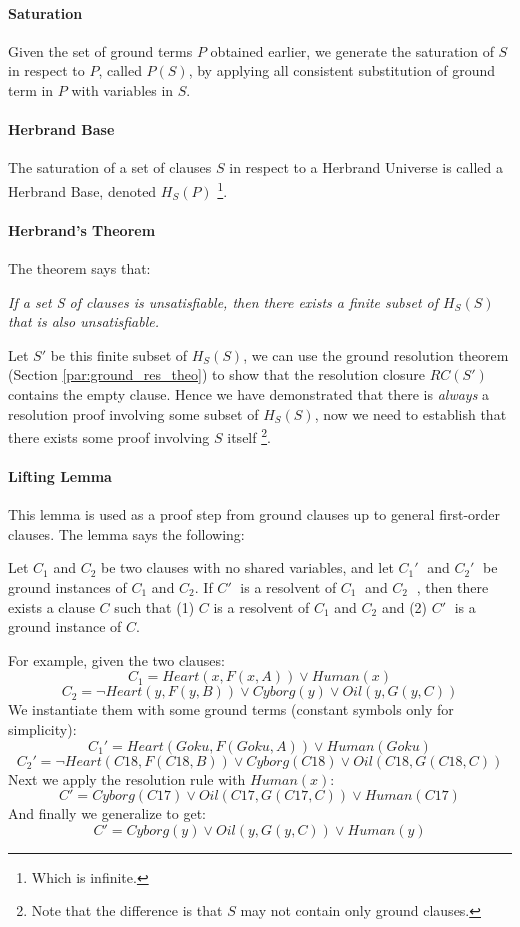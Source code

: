 \documentclass[10pt,a4paper]{article}
\begin{document}
\paragraph{Saturation} Given the set of ground terms $P$ obtained earlier, we generate the saturation of $S$ in respect to $P$, called $P(S)$, by applying all consistent substitution of ground term in $P$ with variables in $S$.

\paragraph{Herbrand Base}
\label{sec:herbrand_base}
The saturation of a set of clauses $S$ in respect to a Herbrand Universe is called a Herbrand Base, denoted $H_S(P)$ \footnote{Which is infinite.}.

\paragraph{Herbrand's Theorem}
The theorem says that:
\begin{center}
\textit{If a set S of clauses is unsatisfiable, then there exists a finite subset of $H_S(S)$ that
is also unsatisfiable.}
\end{center}
Let $S'$ be this finite subset of $H_S(S)$, we can use the ground resolution theorem (Section \ref{par:ground_res_theo}) to show that the resolution closure $RC(S')$ contains the empty clause. Hence we have demonstrated that there is \textit{always} a resolution proof involving some subset of $H_S(S)$, now we need to establish that there exists some proof involving $S$ itself \footnote{Note that the difference is that $S$ may not contain only ground clauses.}.

\paragraph{Lifting Lemma}
This lemma is used as a proof step from ground clauses up to general first-order clauses. The lemma says the following:
\begin{center}
Let $C_1$ and $C_2$ be two clauses with no shared variables, and let $C_1'$ and $C_2'$ be ground instances of $C_1$ and $C_2$. If $C'$ is a resolvent of $C_1$ and $C_2$ , then there exists a clause $C$ such that (1) $C$ is a resolvent of $C_1$ and $C_2$ and (2) $C'$ is a ground instance of $C$.
\end{center} 
For example, given the two clauses:
\[C_1=Heart(x,F(x,A))\vee Human(x)\]
\[C_2=\neg Heart(y,F(y,B))\vee Cyborg(y)\vee Oil(y,G(y,C))\]
We instantiate them with some ground terms (constant symbols only for simplicity):
\[C_1'=Heart(Goku,F(Goku,A))\vee Human(Goku)\]
\[C_2'=\neg Heart(C18,F(C18,B))\vee Cyborg(C18)\vee Oil(C18,G(C18,C))\]
Next we apply the resolution rule with $Human(x)$:
\[C'=Cyborg(C17)\vee Oil(C17,G(C17,C))\vee Human(C17)\]
And finally we generalize to get:
\[C'=Cyborg(y)\vee Oil(y,G(y,C))\vee Human(y)\]
\end{document}
